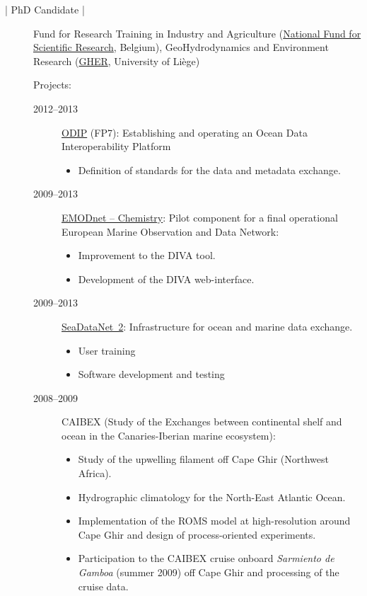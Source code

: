 \documentclass[10pt,a4paper,svgnames]{article}
\begin{document}
\begin{description}
\item[ | PhD Candidate |] Fund for Research Training in Industry and Agriculture (\href{https://www.fnrs.be}{National Fund for Scientific Research}, Belgium), GeoHydrodynamics and Environment Research (\href{http://modb.oce.ulg.ac.be/}{GHER}, University of Li\`{e}ge)

Projects:
\begin{description}

\item[2012--2013] \href{http://www.odip.eu/}{ODIP} (FP7): Establishing and operating an Ocean Data Interoperability Platform
\begin{itemize}
\item Definition of standards for the data and metadata exchange.
\end{itemize}
\item[2009--2013] \href{https://www.emodnet-chemistry.eu}{EMODnet -- Chemistry}: Pilot component for a final operational European Marine Observation and Data Network:
\begin{itemize}
\item Improvement to the DIVA tool.
\item Development of the DIVA web-interface.
\end{itemize}

\item[2009--2013] \href{https://www.seadatanet.org}{SeaDataNet~2}: Infrastructure for ocean and marine data exchange.
\begin{itemize}
\item User training
\item Software development and testing
\end{itemize}

\item[2008--2009] CAIBEX (Study of the Exchanges between continental shelf and ocean in the Canaries-Iberian marine ecosystem):
\begin{itemize}
\item Study of the upwelling filament off Cape Ghir (Northwest Africa).
\item Hydrographic climatology for the North-East Atlantic Ocean.
\item Implementation of the ROMS model at high-resolution around Cape Ghir and design of process-oriented experiments.
\item Participation to the CAIBEX cruise onboard \textit{Sarmiento de Gamboa} (summer 2009) off Cape Ghir and processing of the cruise data.
\end{itemize}


\end{description}
\end{description}
\end{document}
